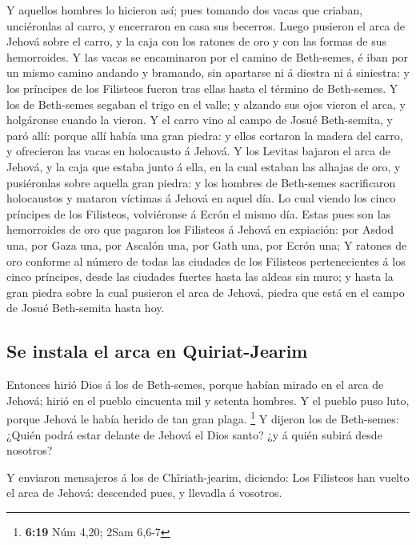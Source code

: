  Y aquellos hombres lo hicieron así; pues tomando dos
vacas que criaban, unciéronlas al carro, y encerraron en casa sus
becerros.  Luego pusieron el arca de Jehová sobre el
carro, y la caja con los ratones de oro y con las formas de sus
hemorroides.  Y las vacas se encaminaron por el camino de
Beth-semes, é iban por un mismo camino andando y bramando, sin apartarse
ni á diestra ni á siniestra: y los príncipes de los Filisteos fueron
tras ellas hasta el término de Beth-semes.  Y los de
Beth-semes segaban el trigo en el valle; y alzando sus ojos vieron el
arca, y holgáronse cuando la vieron.  Y el carro vino al
campo de Josué Beth-semita, y paró allí: porque allí había una gran
piedra: y ellos cortaron la madera del carro, y ofrecieron las vacas en
holocausto á Jehová.  Y los Levitas bajaron el arca de
Jehová, y la caja que estaba junto á ella, en la cual estaban las
alhajas de oro, y pusiéronlas sobre aquella gran piedra: y los hombres
de Beth-semes sacrificaron holocaustos y mataron víctimas á Jehová en
aquel día.  Lo cual viendo los cinco príncipes de los
Filisteos, volviéronse á Ecrón el mismo día.  Estas pues
son las hemorroides de oro que pagaron los Filisteos á Jehová en
expiación: por Asdod una, por Gaza una, por Ascalón una, por Gath una,
por Ecrón una;  Y ratones de oro conforme al número de
todas las ciudades de los Filisteos pertenecientes á los cinco
príncipes, desde las ciudades fuertes hasta las aldeas sin muro; y hasta
la gran piedra sobre la cual pusieron el arca de Jehová, piedra que está
en el campo de Josué Beth-semita hasta hoy.

\hypertarget{se-instala-el-arca-en-quiriat-jearim}{%
\subsection{Se instala el arca en
Quiriat-Jearim}\label{se-instala-el-arca-en-quiriat-jearim}}

 Entonces hirió Dios á los de Beth-semes, porque habían
mirado en el arca de Jehová; hirió en el pueblo cincuenta mil y setenta
hombres. Y el pueblo puso luto, porque Jehová le había herido de tan
gran plaga. \footnote{\textbf{6:19} Núm 4,20; 2Sam 6,6-7}
 Y dijeron los de Beth-semes: ¿Quién podrá estar delante
de Jehová el Dios santo? ¿y á quién subirá desde nosotros?

 Y enviaron mensajeros á los de Chîriath-jearim,
diciendo: Los Filisteos han vuelto el arca de Jehová: descended pues, y
llevadla á vosotros.

